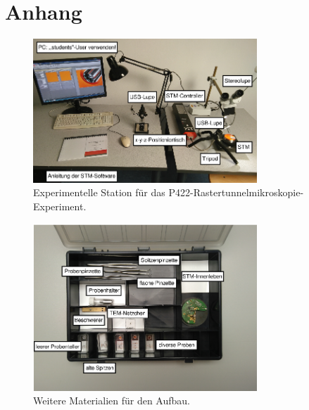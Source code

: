 \chapter{Anhang}

\begin{figure}[H]
    \centering
    \includegraphics[width=0.75\textwidth]{figs/Versuchsaufbau1.png}
    \caption{Experimentelle Station für das P422-Rastertunnelmikroskopie-Experiment. \cite{praktikum}}
    \label{fig:Versuchaufbau1}    
\end{figure}

\begin{figure}[H]
    \centering
    \includegraphics[width=0.75\textwidth]{figs/Versuch_box}
    \caption{Weitere Materialien für den Aufbau. \cite{praktikum}}
    \label{fig:Versuch box}
\end{figure}